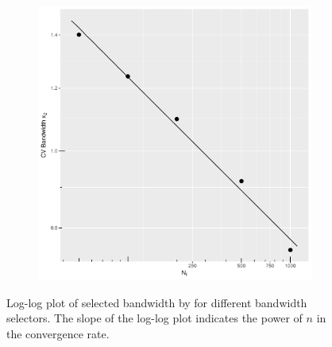 \begin{figure}[htbp]
\begin{subfigure}[t]{0.195\textwidth}
    \end{subfigure}
    \begin{subfigure}[t]{0.195\textwidth}
        \centering
        \captionsetup{width=.8\linewidth}%
        \includegraphics[width=\textwidth]{results/by_h_per_mu/cv_bandwidth_x2_vs_mu.pdf}
    \end{subfigure}
    \caption[Selected bandwidth by ]
        {Log-log plot of selected bandwidth by  for different bandwidth selectors.
        The slope of the log-log plot indicates the power of $n$ in the convergence rate.}
    \label{fig:results:bandwidth_by_incidents}    
\end{figure}

